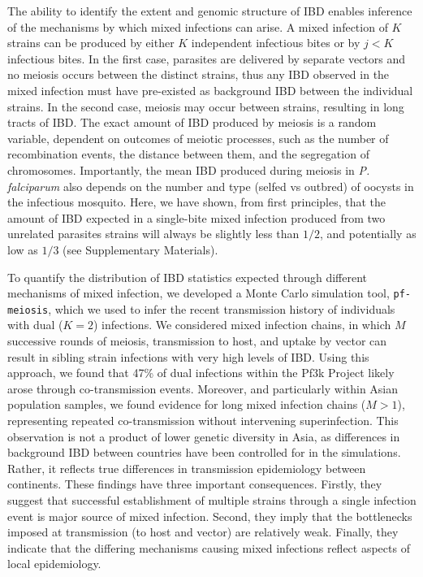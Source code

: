 \documentclass[9pt,lineno]{elife}
\begin{document}
The ability to identify the extent and genomic structure of IBD enables inference of the mechanisms by which mixed infections can arise.  A mixed infection of $K$ strains can be produced by either $K$ independent infectious bites or by $j < K$ infectious bites. In the first case, parasites are delivered by separate vectors and no meiosis occurs between the distinct strains, thus any IBD observed in the mixed infection must have pre-existed as background IBD between the individual strains.  In the second case, meiosis may occur between strains, resulting in long tracts of IBD.  The exact amount of IBD produced by meiosis is a random variable, dependent on outcomes of meiotic processes, such as the number of recombination events, the distance between them, and the segregation of chromosomes.  Importantly, the mean IBD produced during meiosis in \textit{P. falciparum} also depends on the number and type (selfed vs outbred) of oocysts in the infectious mosquito.  Here, we have shown, from first principles, that the amount of IBD expected in a single-bite mixed infection produced from two unrelated parasites strains will always be slightly less than $1/2$, and potentially as low as $1/3$ (see Supplementary Materials).

To quantify the distribution of IBD statistics expected through different mechanisms of mixed infection, we developed a Monte Carlo simulation tool, \texttt{pf-meiosis}, which we used to infer the recent transmission history of individuals with dual ($K=2$) infections.  We considered mixed infection chains, in which $M$ successive rounds of meiosis, transmission to host, and uptake by vector can result in sibling strain infections with very high levels of IBD.  Using this approach, we found that 47\% of dual infections within the Pf3k Project likely arose through co-transmission events. Moreover, and particularly within Asian population samples, we found evidence for long mixed infection chains ($M>1$), representing repeated co-transmission without intervening superinfection.  This observation is not a product of lower genetic diversity in Asia, as differences in background IBD between countries have been controlled for in the simulations. Rather, it reflects true differences in transmission epidemiology between continents. These findings have three important consequences. Firstly, they suggest that successful establishment of multiple strains through a single infection event is major source of mixed infection.  Second, they imply that the bottlenecks imposed at transmission (to host and vector) are relatively weak.  Finally, they indicate that the differing mechanisms causing mixed infections reflect aspects of local epidemiology.
\end{document}
